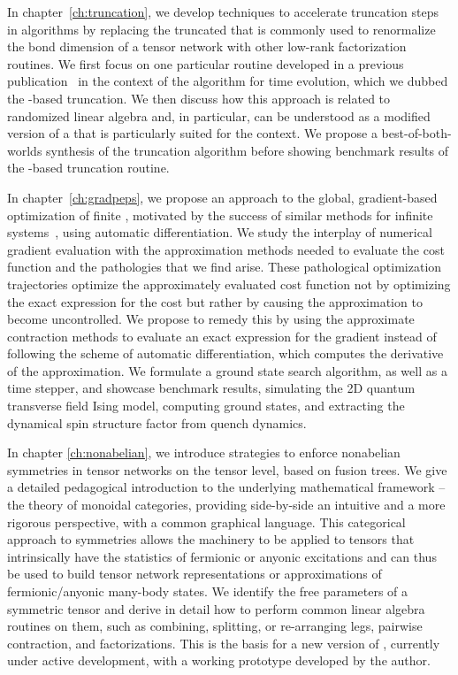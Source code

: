 In chapter~\ref{ch:truncation}, we develop techniques to accelerate truncation steps in  algorithms by replacing the truncated  that is commonly used to renormalize the bond dimension of a tensor network with other low-rank factorization routines.
%
We first focus on one particular routine developed in a previous publication~\cite{unfried2023} in the context of the  algorithm for  time evolution, which we dubbed the -based truncation.
%
We then discuss how this approach is related to randomized linear algebra and, in particular, can be understood as a modified version of a  that is particularly suited for the  context.
%
We propose a best-of-both-worlds synthesis of the truncation algorithm before showing benchmark results of the -based truncation routine.

In chapter~\ref{ch:gradpeps}, we propose an approach to the global, gradient-based optimization of finite , motivated by the success of similar methods for infinite systems~\cite{liao2019, hasik2021, francuz2023}, using automatic differentiation.
%
We study the interplay of numerical gradient evaluation with the approximation methods needed to evaluate the cost function and the pathologies that we find arise.
%
These pathological optimization trajectories optimize the approximately evaluated cost function not by optimizing the exact expression for the cost but rather by causing the approximation to become uncontrolled.
%
We propose to remedy this by using the approximate contraction methods to evaluate an exact expression for the gradient instead of following the scheme of automatic differentiation, which computes the derivative of the approximation.
%
We formulate a ground state search algorithm, as well as a time stepper, and showcase benchmark results, simulating the 2D quantum transverse field Ising model, computing ground states, and extracting the dynamical spin structure factor from quench dynamics.


In chapter \ref{ch:nonabelian}, we introduce strategies to enforce nonabelian symmetries in tensor networks on the tensor level, based on fusion trees.
%
We give a detailed pedagogical introduction to the underlying mathematical framework -- the theory of monoidal categories, providing side-by-side an intuitive and a more rigorous perspective, with a common graphical language.
%
This categorical approach to symmetries allows the machinery to be applied to tensors that intrinsically have the statistics of fermionic or anyonic excitations and can thus be used to build tensor network representations or approximations of fermionic/anyonic many-body states.
%
We identify the free parameters of a symmetric tensor and derive in detail how to perform common linear algebra routines on them, such as combining, splitting, or re-arranging legs, pairwise contraction, and factorizations.
%
This is the basis for a new version of , currently under active development, with a working prototype developed by the author.
%


